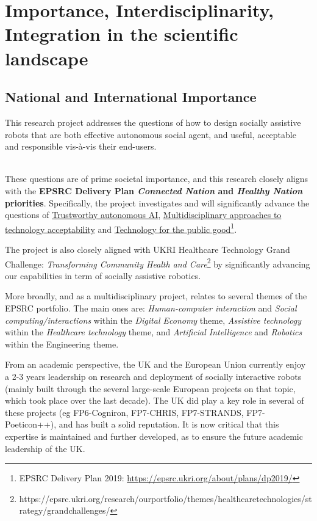\section{Importance, Interdisciplinarity, Integration in the scientific landscape}

\subsection{National and International Importance}

This research project addresses the questions of how to design socially
assistive robots that are both effective autonomous social agent, and useful,
acceptable and responsible vis-à-vis their end-users.

{\color{gray} \\
These questions are of prime societal importance, and this research closely
aligns with the \textbf{EPSRC Delivery Plan \emph{Connected Nation} and
\emph{Healthy Nation} priorities}. Specifically, the project
investigates and will significantly advance the questions of \ul{Trustworthy
autonomous AI}, \ul{Multidisciplinary approaches to technology acceptability}
and \ul{Technology for the public good}\footnote{EPSRC Delivery Plan 2019:
\url{https://epsrc.ukri.org/about/plans/dp2019/}}.

The project is also closely aligned with UKRI Healthcare Technology Grand
Challenge: \emph{Transforming Community Health and
Care}\footnote{https://epsrc.ukri.org/research/ourportfolio/themes/healthcaretechnologies/strategy/grandchallenges/}
by significantly advancing our capabilities in term of socially assistive
robotics.

More broadly, and as a multidisciplinary project, \project relates to several
themes of the EPSRC portfolio. The main ones are: \emph{Human-computer
interaction} and \emph{Social computing/interactions} within the \emph{Digital
Economy} theme, \emph{Assistive technology} within the \emph{Healthcare
technology} theme, and \emph{Artificial Intelligence} and \emph{Robotics} within
the Engineering theme.
}

From an academic perspective, the UK and the European Union currently enjoy a
2-3 years leadership on research and deployment of socially interactive robots
(mainly built through the several large-scale European projects on that topic,
which took place over the last decade). The UK did play a key role in several of
these projects (eg FP6-Cogniron, FP7-CHRIS, FP7-STRANDS, FP7-Poeticon++), and
has built a solid reputation. It is now critical that this expertise is
maintained and further developed, as to ensure the future academic leadership of
the UK.

